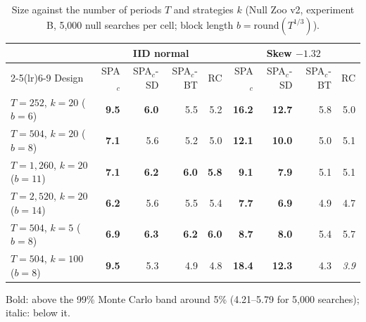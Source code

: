 \begin{table}[t]
\centering
\footnotesize
\setlength{\tabcolsep}{3.5pt}
\caption{Size against the number of periods $T$ and strategies $k$ (Null Zoo v2, experiment B, 5,000 null searches per cell; block length $b=\mathrm{round}(T^{1/3})$).}
\label{tab:grid}
\begin{tabular}{lrrrrrrrr}
\toprule
 & \multicolumn{4}{c}{IID normal} & \multicolumn{4}{c}{Skew $-1.32$} \\
\cmidrule(lr){2-5}\cmidrule(lr){6-9}
Design & SPA$_c$ & SPA$_c$-SD & SPA$_c$-BT & RC & SPA$_c$ & SPA$_c$-SD & SPA$_c$-BT & RC \\
\midrule
$T=252$, $k=20$ ($b=6$) & \textbf{9.5} & \textbf{6.0} & 5.5 & 5.2 & \textbf{16.2} & \textbf{12.7} & 5.8 & 5.0 \\
$T=504$, $k=20$ ($b=8$) & \textbf{7.1} & 5.6 & 5.2 & 5.0 & \textbf{12.1} & \textbf{10.0} & 5.0 & 5.1 \\
$T=1,260$, $k=20$ ($b=11$) & \textbf{7.1} & \textbf{6.2} & \textbf{6.0} & \textbf{5.8} & \textbf{9.1} & \textbf{7.9} & 5.1 & 5.1 \\
$T=2,520$, $k=20$ ($b=14$) & \textbf{6.2} & 5.6 & 5.5 & 5.4 & \textbf{7.7} & \textbf{6.9} & 4.9 & 4.7 \\
$T=504$, $k=5$ ($b=8$) & \textbf{6.9} & \textbf{6.3} & \textbf{6.2} & \textbf{6.0} & \textbf{8.7} & \textbf{8.0} & 5.4 & 5.7 \\
$T=504$, $k=100$ ($b=8$) & \textbf{9.5} & 5.3 & 4.9 & 4.8 & \textbf{18.4} & \textbf{12.3} & 4.3 & \textit{3.9} \\
\bottomrule
\end{tabular}
\par\smallskip\begin{minipage}{0.97\linewidth}\footnotesize Bold: above the 99\% Monte Carlo band around 5\% (4.21--5.79 for 5,000 searches); italic: below it.\end{minipage}
\end{table}

